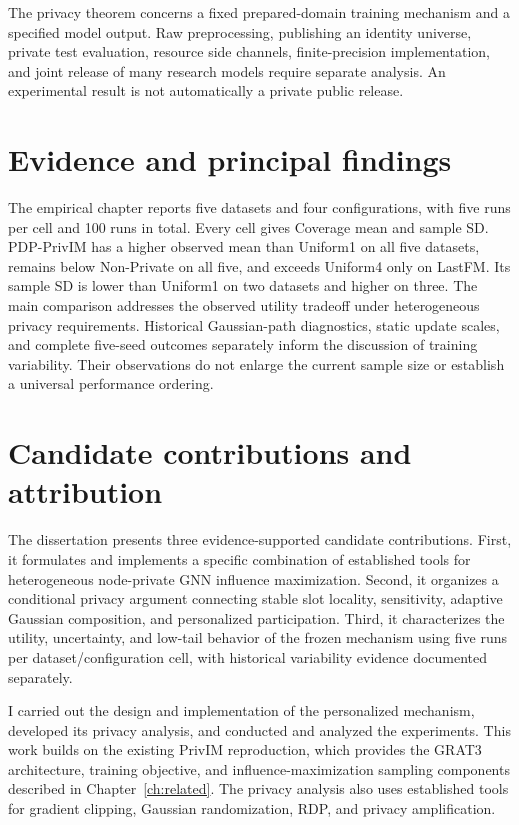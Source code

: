 The privacy theorem concerns a fixed prepared-domain training mechanism and a specified model output. Raw preprocessing, publishing an identity universe, private test evaluation, resource side channels, finite-precision implementation, and joint release of many research models require separate analysis. An experimental result is not automatically a private public release.

\section{Evidence and principal findings}
The empirical chapter reports five datasets and four configurations, with five runs per cell and 100 runs in total. Every cell gives Coverage mean and sample SD. PDP-PrivIM has a higher observed mean than Uniform1 on all five datasets, remains below Non-Private on all five, and exceeds Uniform4 only on LastFM. Its sample SD is lower than Uniform1 on two datasets and higher on three.
The main comparison addresses the observed utility tradeoff under heterogeneous privacy requirements. Historical Gaussian-path diagnostics, static update scales, and complete five-seed outcomes separately inform the discussion of training variability. Their observations do not enlarge the current sample size or establish a universal performance ordering.

\section{Candidate contributions and attribution}
The dissertation presents three evidence-supported candidate contributions. First, it formulates and implements a specific combination of established tools for heterogeneous node-private GNN influence maximization. Second, it organizes a conditional privacy argument connecting stable slot locality, sensitivity, adaptive Gaussian composition, and personalized participation. Third, it characterizes the utility, uncertainty, and low-tail behavior of the frozen mechanism using five runs per dataset/configuration cell, with historical variability evidence documented separately.

I carried out the design and implementation of the personalized mechanism, developed its privacy analysis, and conducted and analyzed the experiments. This work builds on the existing PrivIM reproduction, which provides the GRAT3 architecture, training objective, and influence-maximization sampling components described in Chapter~\ref{ch:related}. The privacy analysis also uses established tools for gradient clipping, Gaussian randomization, RDP, and privacy amplification.

